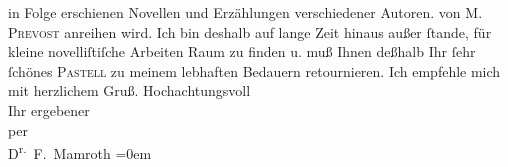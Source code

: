 \begin{ledgroupsized}[t]{13cm}
{{{                    in Folge erschienen Novellen und Erzählungen verschiedener Autoren.}}}\label{K_L00311_1h} von \textsc{M. Prevost} anreihen wird. Ich bin deshalb auf lange Zeit hinaus außer ſtande,
                    für kleine novelliſtiſche Arbeiten Raum zu finden u. muß Ihnen deßhalb Ihr ſehr
                    ſchönes \textsc{Pastell} zu meinem lebhaften Bedauern retournieren. Ich empfehle mich mit
                    herzlichem Gruß.\pend
           \pstart
           Hochachtungsvoll{\\[\baselineskip]}Ihr ergebener{\\[\baselineskip]}per{\\[\baselineskip]}\spacefill\mbox{D\textsuperscript{r.} F. Mamroth}\pend
           \leftskip=0em{}
         
         \endnumbering{}\end{ledgroupsized}  \newcommand{\dateiname}{L00311}\newcommand{\titel}{Fedor Mamroth an Arthur Schnitzler, 4. 4. 1894}\newcommand{\editorInnen}{Martin Anton Müller und Gerd-Hermann Susen}
      